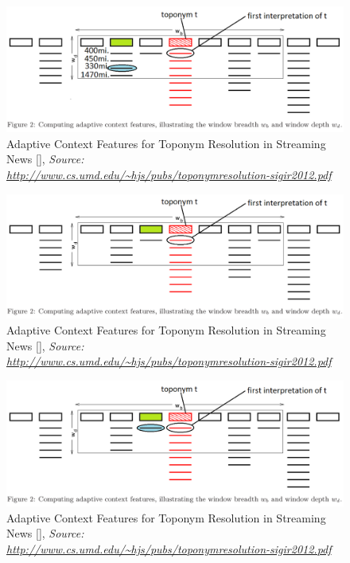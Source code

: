 \documentclass{beamer}
\begin{document}
{\begin{overprint}
		\begin{figure}
			\includegraphics[width=\textwidth]{adaptive-proximity-i.png} 
			\caption{Adaptive Context Features for Toponym Resolution in Streaming News [], \textit{Source: \url{http://www.cs.umd.edu/~hjs/pubs/toponymresolution-sigir2012.pdf}}}
		\end{figure}
		
		\begin{figure}
			\includegraphics[width=\textwidth]{adaptive-proximity-j.png} 
			\caption{Adaptive Context Features for Toponym Resolution in Streaming News [], \textit{Source: \url{http://www.cs.umd.edu/~hjs/pubs/toponymresolution-sigir2012.pdf}}}
		\end{figure}
		
		\begin{figure}
			\includegraphics[width=\textwidth]{adaptive-proximity-j1.png} 
			\caption{Adaptive Context Features for Toponym Resolution in Streaming News [], \textit{Source: \url{http://www.cs.umd.edu/~hjs/pubs/toponymresolution-sigir2012.pdf}}}
		\end{figure}
		

\end{overprint}}
\end{document}
